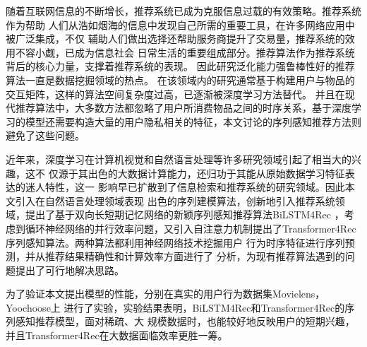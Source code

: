 ﻿%
\begin{cabstract}

    随着互联网信息的不断增长，推荐系统已成为克服信息过载的有效策略。推荐系统作为帮助%
    人们从浩如烟海的信息中发现自己所需的重要工具，在许多网络应用中被广泛集成，不仅%
    辅助人们做出选择还帮助服务商提升了交易量，推荐系统的效用不容小觑，已成为信息社会%
    日常生活的重要组成部分。推荐算法作为推荐系统背后的核心力量，支撑着推荐系统的表现。%
    因此研究泛化能力强鲁棒性好的推荐算法一直是数据挖掘领域的热点。
    在该领域内的研究通常基于构建用户与物品的交互矩阵，这样的算法空间复杂度过高，已逐渐被深度学习方法替代。
    并且在现代推荐算法中，大多数方法都忽略了用户所消费物品之间的时序关系，基于深度学习的模型还需要构造大量的用户隐私相关的特征，本文讨论的序列感知推荐方法则避免了这些问题。

    近年来，深度学习在计算机视觉和自然语言处理等许多研究领域引起了相当大的兴趣，这不%
    仅源于其出色的大数据计算能力，还归功于其能从原始数据学习特征表达的迷人特性，这一%
    影响早已扩散到了信息检索和推荐系统的研究领域。因此本文引入在自然语言处理领域表现
    出色的序列建模算法，创新地引入推荐系统领域，提出了基于双向长短期记忆网络的新颖序列感知推荐算法BiLSTM4Rec
    ，考虑到循环神经网络的并行效率问题，又引入自注意力机制提出了Transformer4Rec序列感知算法。两种算法都利用神经网络技术挖掘用户%
    行为时序特征进行序列预测，并从推荐结果精确性和计算效率方面进行了%
    分析，为现有推荐算法遇到的问题提出了可行地解决思路。

    为了验证本文提出模型的性能，分别在真实的用户行为数据集Movielens，Yoochoose上%
    进行了实验，实验结果表明，BiLSTM4Rec和Transformer4Rec的序列感知推荐模型，面对稀疏、大%
    规模数据时，也能较好地反映用户的短期兴趣，并且Transformer4Rec在大数据面临效率更胜一筹。

\end{cabstract}

